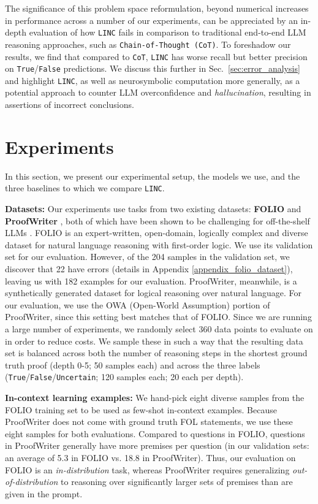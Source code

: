 \documentclass[11pt]{article}
\begin{document}
The significance of this problem space reformulation, beyond numerical increases in performance across a number of our experiments, can be appreciated by an in-depth evaluation of how \texttt{LINC} fails in comparison to traditional end-to-end LLM reasoning approaches, such as \texttt{Chain-of-Thought (CoT)}.
To foreshadow our results, we find that compared to \texttt{CoT}, \texttt{LINC} has worse recall but better precision on \texttt{True}/\texttt{False} predictions.
We discuss this further in Sec.~\ref{sec:error_analysis} and highlight \texttt{LINC}, as well as neurosymbolic computation more generally, as a potential approach to counter LLM overconfidence and \textit{hallucination}, resulting in assertions of incorrect conclusions.

\section{Experiments}\label{sec:experiments}
In this section, we present our experimental setup, the models we use, and the three baselines to which we compare \texttt{LINC}.

\textbf{Datasets:} Our experiments use tasks from two existing datasets: \textbf{FOLIO} \cite{han2022folio} and \textbf{ProofWriter} \cite{tafjord2020proofwriter}, both of which have been shown to be challenging for off-the-shelf LLMs \cite{han2022folio, creswell2022selection}. FOLIO is an expert-written, open-domain, logically complex and diverse dataset for natural language reasoning with first-order logic. We use its validation set for our evaluation. However, of the 204 samples in the validation set, we discover that 22 have errors (details in Appendix \ref{appendix_folio_dataset}), leaving us with 182 examples for our evaluation. ProofWriter, meanwhile, is a synthetically generated dataset for logical reasoning over natural language. For our evaluation, we use the OWA (Open-World Assumption) portion of ProofWriter, since this setting best matches that of FOLIO. Since we are running a large number of experiments, we randomly select 360 data points to evaluate on in order to reduce costs. We sample these in such a way that the resulting data set is balanced across both the number of reasoning steps in the shortest ground truth proof (depth 0-5; 50 samples each) and across the three labels (\texttt{True}/\texttt{False}/\texttt{Uncertain}; 120 samples each; 20 each per depth).

\textbf{In-context learning examples:} We hand-pick eight diverse samples from the FOLIO training set to be used as few-shot in-context examples. Because ProofWriter does not come with ground truth FOL statements, we use these eight samples for both evaluations. Compared to questions in FOLIO, questions in ProofWriter generally have more premises per question (in our validation sets: an average of 5.3 in FOLIO vs. 18.8 in ProofWriter).
Thus, our evaluation on FOLIO is an \emph{in-distribution} task, whereas ProofWriter requires generalizing \emph{out-of-distribution} to reasoning over significantly larger sets of premises than are given in the prompt.
\end{document}
